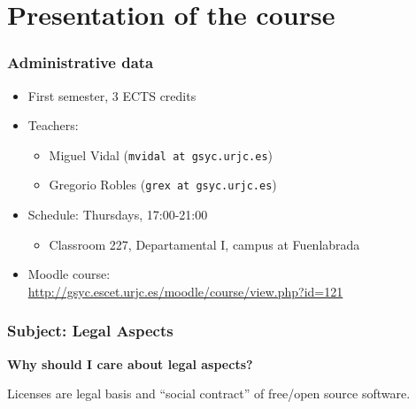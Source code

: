 

\section{Presentation of the course}


\begin{frame}
\frametitle{Administrative data}

\begin{itemize}
\item First semester, 3 ECTS credits
\item Teachers:
  \begin{itemize}
  \item \alert{Miguel Vidal} (\texttt{mvidal at gsyc.urjc.es})
  \item \alert{Gregorio Robles} (\texttt{grex at gsyc.urjc.es})
  \end{itemize}
\item Schedule: \alert{Thursdays, 17:00-21:00}
  \begin{itemize}
  \item Classroom 227, Departamental I, campus at Fuenlabrada
  \end{itemize}
\item Moodle course: \\
  {\footnotesize\url{http://gsyc.escet.urjc.es/moodle/course/view.php?id=121}}
\end{itemize}
\end{frame}



\begin{frame}
\frametitle{Subject: Legal Aspects}


\center \Large \textbf{Why should I care about legal aspects?}
 
\pause

\bigskip

\begin{center}
\alert{Licenses are legal basis and ``social contract'' of free/open source software.}
\end{center}

\end{frame}

